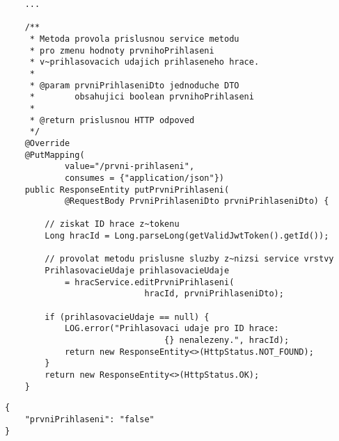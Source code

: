 \documentclass[twoside, 12pt]{article}
\begin{document}
{{\begin{lstlisting}
    ...

    /**
     * Metoda provola prislusnou service metodu
     * pro zmenu hodnoty prvnihoPrihlaseni
     * v~prihlasovacich udajich prihlaseneho hrace.
     *
     * @param prvniPrihlaseniDto jednoduche DTO
     *        obsahujici boolean prvnihoPrihlaseni
     *
     * @return prislusnou HTTP odpoved
     */
    @Override
    @PutMapping(
            value="/prvni-prihlaseni",
            consumes = {"application/json"})
    public ResponseEntity putPrvniPrihlaseni(
            @RequestBody PrvniPrihlaseniDto prvniPrihlaseniDto) {

        // ziskat ID hrace z~tokenu
        Long hracId = Long.parseLong(getValidJwtToken().getId());

        // provolat metodu prislusne sluzby z~nizsi service vrstvy
        PrihlasovacieUdaje prihlasovacieUdaje
            = hracService.editPrvniPrihlaseni(
                            hracId, prvniPrihlaseniDto);

        if (prihlasovacieUdaje == null) {
            LOG.error("Prihlasovaci udaje pro ID hrace:
                                {} nenalezeny.", hracId);
            return new ResponseEntity<>(HttpStatus.NOT_FOUND);
        }
        return new ResponseEntity<>(HttpStatus.OK);
    }
\end{lstlisting}

\clearpage


\vspace{10}



\vspace{10}


\begin{lstlisting}
{
    "prvniPrihlaseni": "false"
}
\end{lstlisting}

\vspace{10}


\vspace{10}


}}
\end{document}
